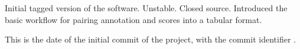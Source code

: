 Initial tagged version of the software. Unstable. Closed
source. Introduced the basic workflow for pairing annotation
and scores into a tabular format.


This is the date of the initial commit of the project, with
the commit identifier .

    
    
    



